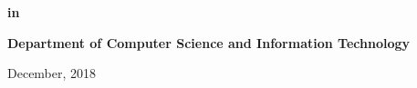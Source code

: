 \documentclass[a4paper,12pt]{report}
\begin{document}
\begin{titlepage}
\begin{center}
\textbf{{\large{in}}}
\end{center}

\begin{center}
\textbf{\Large{Department of Computer Science and Information Technology}}\\
\end{center}

\vspace{0.5cm}
\begin{center}
\Large{December, 2018}
\end{center}
\end{titlepage}

\newpage
\end{document}
